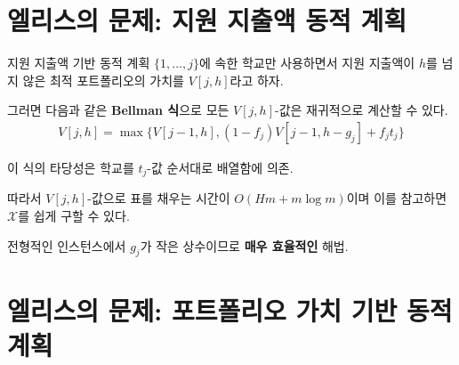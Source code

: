 \documentclass[10pt,slidestop,compress,mathserif,notheorems]{beamer}
\newif\ifen
\theoremstyle{definition}
\theoremstyle{definition}
\begin{document}
\ifen \section{Ellis's problem: Expenditures DP} \else \section{엘리스의 문제: 지원 지출액 동적 계획}\fi

\begin{frame}{\ifen Expenditures-based dynamic program\else 지원 지출액 기반 동적 계획\fi}
\ifen Let $V[j,h] $ denote the value of the optimal portfolio that uses only the schools $\{ 1, \dots, j\}$ and costs no more than $h$.
\else $\{ 1, \dots, j\}$에 속한 학교만 사용하면서 지원 지출액이 $h$를 넘지 않은 최적 포트폴리오의 가치를 $V[j, h]$라고 하자.\fi

\ifen Then we can use the following \textbf{Bellman equation} to compute all the $V[j, h]$-values recursively.
\else 그러면 다음과 같은 \textbf{Bellman 식}으로 모든 $V[j, h]$-값은 재귀적으로 계산할 수 있다. \fi
\begin{align*}
V[j, h] = \max\bigl\{ V[j-1, h], (1 - f_j) V[j-1, h-g_j] + f_j t_j \bigr\}
\end{align*}
\ifen
This equation works because the $t_j$-values are indexed in ascending order.

Filling a lookup table with the $V[j, h]$-values therefore costs $O(Hm + m\log m)$, and then computing $\mathcal{X}$ is trivial.

\textbf{Very effective} on typical instances where $g_j$ are small integers.
\else
이 식의 타당성은 학교를 $t_j$-값 순서대로 배열함에 의존.

따라서 $V[j, h]$-값으로 표를 채우는 시간이 $O(Hm + m\log m)$이며 이를 참고하면 $\mathcal{X}$를 쉽게 구할 수 있다.

전형적인 인스턴스에서 $g_j$가 작은 상수이므로 \textbf{매우 효율적인} 해법.
\fi
\end{frame}







\ifen \section{Ellis's problem: Valuations DP} \else \section{엘리스의 문제: 포트폴리오 가치 기반 동적 계획}\fi
\end{document}
